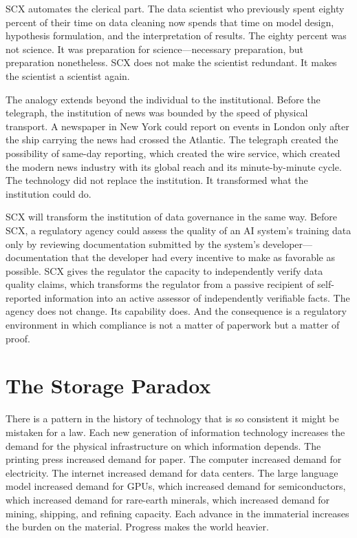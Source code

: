 \documentclass[12pt,a4paper]{article}
\begin{document}
SCX automates the clerical part. The data scientist who previously spent eighty percent of their time on data cleaning now spends that time on model design, hypothesis formulation, and the interpretation of results. The eighty percent was not science. It was preparation for science---necessary preparation, but preparation nonetheless. SCX does not make the scientist redundant. It makes the scientist a scientist again.

The analogy extends beyond the individual to the institutional. Before the telegraph, the institution of news was bounded by the speed of physical transport. A newspaper in New York could report on events in London only after the ship carrying the news had crossed the Atlantic. The telegraph created the possibility of same-day reporting, which created the wire service, which created the modern news industry with its global reach and its minute-by-minute cycle. The technology did not replace the institution. It transformed what the institution could do.

SCX will transform the institution of data governance in the same way. Before SCX, a regulatory agency could assess the quality of an AI system's training data only by reviewing documentation submitted by the system's developer---documentation that the developer had every incentive to make as favorable as possible. SCX gives the regulator the capacity to independently verify data quality claims, which transforms the regulator from a passive recipient of self-reported information into an active assessor of independently verifiable facts. The agency does not change. Its capability does. And the consequence is a regulatory environment in which compliance is not a matter of paperwork but a matter of proof.

\section{The Storage Paradox}

There is a pattern in the history of technology that is so consistent it might be mistaken for a law. Each new generation of information technology increases the demand for the physical infrastructure on which information depends. The printing press increased demand for paper. The computer increased demand for electricity. The internet increased demand for data centers. The large language model increased demand for GPUs, which increased demand for semiconductors, which increased demand for rare-earth minerals, which increased demand for mining, shipping, and refining capacity. Each advance in the immaterial increases the burden on the material. Progress makes the world heavier.
\end{document}
